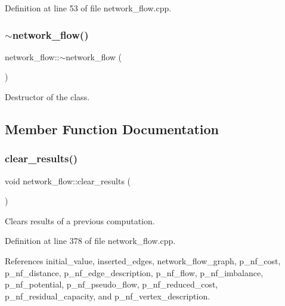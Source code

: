 Definition at line 53 of file network\+\_\+flow.\+cpp.

\mbox{\label{classnetwork__flow_a83ed613ca69ee8835a5823fc56195ddc}} 
\subsubsection{\texorpdfstring{$\sim$network\+\_\+flow()}{~network\_flow()}}
{\footnotesize\ttfamily network\+\_\+flow\+::$\sim$network\+\_\+flow (\begin{DoxyParamCaption}{ }\end{DoxyParamCaption})\hspace{0.3cm}{\ttfamily [default]}}



Destructor of the class. 



\subsection{Member Function Documentation}
\mbox{\label{classnetwork__flow_a7c6260f32d2ece0115ad0773348774b4}} 
\subsubsection{\texorpdfstring{clear\+\_\+results()}{clear\_results()}}
{\footnotesize\ttfamily void network\+\_\+flow\+::clear\+\_\+results (\begin{DoxyParamCaption}{ }\end{DoxyParamCaption})}



Clears results of a previous computation. 



Definition at line 378 of file network\+\_\+flow.\+cpp.



References initial\+\_\+value, inserted\+\_\+edges, network\+\_\+flow\+\_\+graph, p\+\_\+nf\+\_\+cost, p\+\_\+nf\+\_\+distance, p\+\_\+nf\+\_\+edge\+\_\+description, p\+\_\+nf\+\_\+flow, p\+\_\+nf\+\_\+imbalance, p\+\_\+nf\+\_\+potential, p\+\_\+nf\+\_\+pseudo\+\_\+flow, p\+\_\+nf\+\_\+reduced\+\_\+cost, p\+\_\+nf\+\_\+residual\+\_\+capacity, and p\+\_\+nf\+\_\+vertex\+\_\+description.



